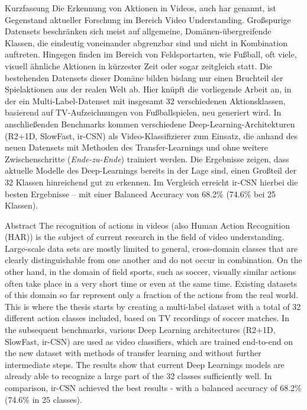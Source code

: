 \newcommand{\primarymetric}{68.2}
\newcommand{\secondarymetric}{74.6}

\begin{prefacesection}{Kurzfassung}
    Die Erkennung von Aktionen in Videos, auch \gls{har} genannt, ist Gegenstand aktueller Forschung im Bereich Video Understanding.
    Großspurige Datensets beschränken sich meist auf allgemeine, Domänen-übergreifende Klassen, die eindeutig voneinander abgrenzbar sind und nicht in Kombination auftreten.
    Hingegen finden im Bereich von Feldsportarten, wie Fußball, oft viele, visuell ähnliche Aktionen in kürzester Zeit oder sogar zeitgleich statt.
    Die bestehenden Datensets dieser Domäne bilden bislang nur einen Bruchteil der Spielaktionen aus der realen Welt ab.
    Hier knüpft die vorliegende Arbeit an, in der ein Multi-Label-Datenset mit insgesamt 32 verschiedenen Aktionsklassen, basierend auf TV-Aufzeichnungen von Fußballspielen, neu generiert wird.
    In anschließenden Benchmarks kommen verschiedene Deep-Learning-Architekturen (R2+1D, SlowFast, ir-CSN) als Video-Klassifizierer zum Einsatz, die anhand des neuen Datensets mit Methoden des Transfer-Learnings und ohne weitere Zwischenschritte (\emph{Ende-zu-Ende}) trainiert werden.
    Die Ergebnisse zeigen, dass aktuelle Modelle des Deep-Learnings bereits in der Lage sind, einen Großteil der 32 Klassen hinreichend gut zu erkennen.
    Im Vergleich erreicht ir-CSN hierbei die besten Ergebnisse -- mit einer Balanced Accuracy von \primarymetric \% (\secondarymetric \% bei 25 Klassen).
\end{prefacesection}

\vfill

\begin{prefacesection}{Abstract}
    The recognition of actions in videos (also Human Action Recognition (HAR)) is the subject of current research in the field of video understanding.
    Large-scale data sets are mostly limited to general, cross-domain classes that are clearly distinguishable from one another and do not occur in combination.
    On the other hand, in the domain of field sports, such as soccer, visually similar actions often take place in a very short time or even at the same time.
    Existing datasets of this domain so far represent only a fraction of the actions from the real world.
    This is where the thesis starts by creating a multi-label dataset with a total of 32 different action classes included, based on TV recordings of soccer matches.
    In the subsequent benchmarks, various Deep Learning architectures (R2+1D, SlowFast, ir-CSN) are used as video classifiers, which are trained end-to-end on the new dataset with methods of transfer learning and without further intermediate steps.
    The results show that current Deep Learnings models are already able to recognize a large part of the 32 classes sufficiently well.
    In comparison, ir-CSN achieved the best results - with a balanced accuracy of \primarymetric \% (\secondarymetric \% in 25 classes).

\end{prefacesection}